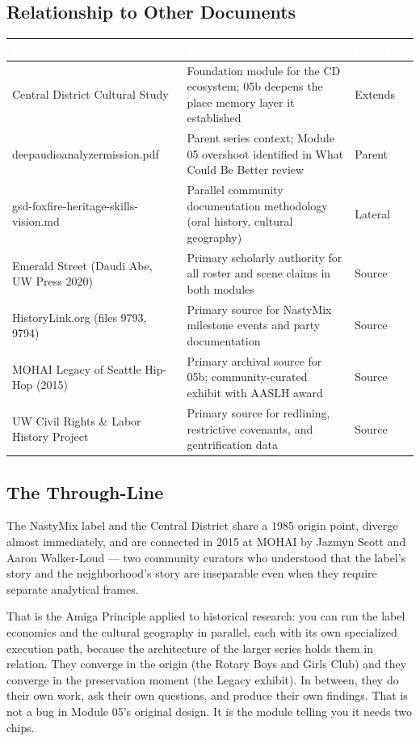 \documentclass[11pt,letterpaper]{article}
\newcommand{\tableheader}[1]{\textbf{\sffamily\textcolor{white}{#1}}}
\begin{document}
\subsection{Relationship to Other Documents}

\begin{center}
\begin{tabularx}{\textwidth}{L{4cm}XL{3cm}}
\toprule
{}
\tableheader{Document} & \tableheader{Relationship} & \tableheader{Direction} \\
\midrule
Central District Cultural Study & Foundation module for the CD ecosystem; 05b deepens the place memory layer it established & Extends \\
deepaudioanalyzermission.pdf & Parent series context; Module 05 overshoot identified in What Could Be Better review & Parent \\
gsd-foxfire-heritage-skills-vision.md & Parallel community documentation methodology (oral history, cultural geography) & Lateral \\
Emerald Street (Daudi Abe, UW Press 2020) & Primary scholarly authority for all roster and scene claims in both modules & Source \\
HistoryLink.org (files 9793, 9794) & Primary source for NastyMix milestone events and party documentation & Source \\
MOHAI Legacy of Seattle Hip-Hop (2015) & Primary archival source for 05b; community-curated exhibit with AASLH award & Source \\
UW Civil Rights \& Labor History Project & Primary source for redlining, restrictive covenants, and gentrification data & Source \\
\bottomrule
\end{tabularx}
\end{center}

\subsection{The Through-Line}

The NastyMix label and the Central District share a 1985 origin point, diverge almost immediately,
and are connected in 2015 at MOHAI by Jazmyn Scott and Aaron Walker-Loud --- two community curators
who understood that the label's story and the neighborhood's story are inseparable even when they
require separate analytical frames.

That is the Amiga Principle applied to historical research: you can run the label economics and the
cultural geography in parallel, each with its own specialized execution path, because the architecture
of the larger series holds them in relation. They converge in the origin (the Rotary Boys and Girls
Club) and they converge in the preservation moment (the Legacy exhibit). In between, they do their
own work, ask their own questions, and produce their own findings. That is not a bug in Module 05's
original design. It is the module telling you it needs two chips.
\end{document}
